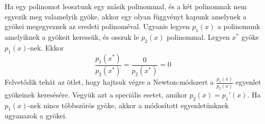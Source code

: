 \documentclass[a4paper,12pt]{report}
\begin{document}
			Ha egy polinomot leosztunk egy másik polinommal, és a két polinomnak nem egyezik meg valamelyik gyöke, akkor egy olyan függvényt kapunk amelynek a gyökei megegyeznek az eredeti polinoméval. Ugyanis legyen $p_1(x)$ a polinomunk amelyiknek a gyökeit keressük, és osszuk le $p_2(x)$ polinommal. Legyen $x^*$ gyöke $p_1(x)$-nek. Ekkor
			\[ \frac{p_1(x^*)}{p_2(x^*)}=\frac{0}{p_2(x^*)}=0\]
			Felvetődik tehát az ötlet, hogy hajtsuk végre a Newton-módszert a $\frac{p_1(x)}{p_2(x)}$ egyenlet gyökeinek keresésére. Vegyük azt a speciális esetet, amikor $p_2(x)=p_1'(x)$. Ha $p_1(x)$-nek nincs többszörös gyöke, akkor a módosított egyenletünknek ugyanazok a gyökei.
			
			\begin{figure}[ht]
				\hfill
				\caption{}
			\end{figure}
   










\end{document}
